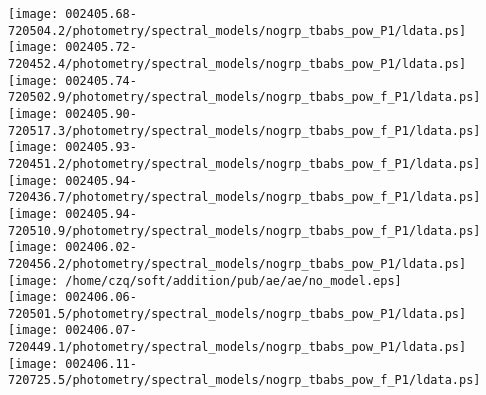 \documentclass{aastex}
\begin{document}
\begin{figure*}[!ht]
\centering
\texttt{[image: 002405.68-720504.2/photometry/spectral\_models/nogrp\_tbabs\_pow\_P1/ldata.ps]} \hfill 
\texttt{[image: 002405.72-720452.4/photometry/spectral\_models/nogrp\_tbabs\_pow\_P1/ldata.ps]} \hfill 
\texttt{[image: 002405.74-720502.9/photometry/spectral\_models/nogrp\_tbabs\_pow\_f\_P1/ldata.ps]} \\ 
\vspace*{0.5in}
\texttt{[image: 002405.90-720517.3/photometry/spectral\_models/nogrp\_tbabs\_pow\_f\_P1/ldata.ps]} \hfill 
\texttt{[image: 002405.93-720451.2/photometry/spectral\_models/nogrp\_tbabs\_pow\_f\_P1/ldata.ps]} \hfill 
\texttt{[image: 002405.94-720436.7/photometry/spectral\_models/nogrp\_tbabs\_pow\_f\_P1/ldata.ps]} \\ 
\vspace*{0.5in}
\texttt{[image: 002405.94-720510.9/photometry/spectral\_models/nogrp\_tbabs\_pow\_f\_P1/ldata.ps]} \hfill 
\texttt{[image: 002406.02-720456.2/photometry/spectral\_models/nogrp\_tbabs\_pow\_P1/ldata.ps]} \hfill 
\texttt{[image: /home/czq/soft/addition/pub/ae/ae/no\_model.eps]} \\ 
\vspace*{0.5in}
\texttt{[image: 002406.06-720501.5/photometry/spectral\_models/nogrp\_tbabs\_pow\_P1/ldata.ps]} \hfill 
\texttt{[image: 002406.07-720449.1/photometry/spectral\_models/nogrp\_tbabs\_pow\_P1/ldata.ps]} \hfill 
\texttt{[image: 002406.11-720725.5/photometry/spectral\_models/nogrp\_tbabs\_pow\_f\_P1/ldata.ps]} \\ 
\vspace*{0.5in}
\end{figure*}
\clearpage
\end{document}

